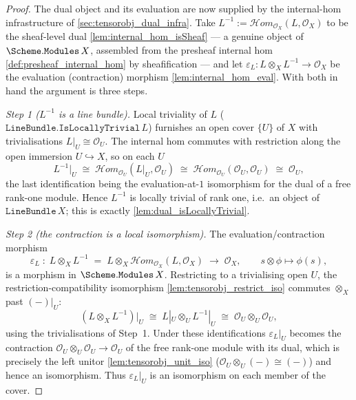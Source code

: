 \begin{proof}
  The dual object and its evaluation are now supplied by the internal-hom
  infrastructure of \cref{sec:tensorobj_dual_infra}. Take
  \(L^{-1} := \mathcal{H}om_{\mathcal{O}_X}(L, \mathcal{O}_X)\) to be the
  sheaf-level dual \cref{lem:internal_hom_isSheaf} --- a genuine object of
  \(\Scheme.\mathtt{Modules}\,X\), assembled from the presheaf internal hom
  \cref{def:presheaf_internal_hom} by sheafification --- and let
  \(\varepsilon_L : L \otimes_X L^{-1} \to \mathcal{O}_X\) be the evaluation
  (contraction) morphism \cref{lem:internal_hom_eval}. With both in hand the
  argument is three steps.

  \emph{Step 1 (\(L^{-1}\) is a line bundle).} Local triviality of \(L\)
  (\(\mathtt{LineBundle.IsLocallyTrivial}\,L\)) furnishes an open cover \(\{U\}\) of
  \(X\) with trivialisations \(L|_U \cong \mathcal{O}_U\). The internal hom commutes
  with restriction along the open immersion \(U \hookrightarrow X\), so on each \(U\)
  \[
    L^{-1}\big|_U \;\cong\; \mathcal{H}om_{\mathcal{O}_U}(L|_U, \mathcal{O}_U)
                 \;\cong\; \mathcal{H}om_{\mathcal{O}_U}(\mathcal{O}_U, \mathcal{O}_U)
                 \;\cong\; \mathcal{O}_U ,
  \]
  the last identification being the evaluation-at-\(1\) isomorphism for the dual of a
  free rank-one module. Hence \(L^{-1}\) is locally trivial of rank one, i.e.\ an
  object of \(\texttt{LineBundle}\,X\); this is exactly
  \cref{lem:dual_isLocallyTrivial}.

  \emph{Step 2 (the contraction is a local isomorphism).} The evaluation/contraction
  morphism
  \[
    \varepsilon_L \;\colon\; L \otimes_X L^{-1}
      \;=\; L \otimes_X \mathcal{H}om_{\mathcal{O}_X}(L, \mathcal{O}_X)
      \;\longrightarrow\; \mathcal{O}_X,
    \qquad s \otimes \phi \longmapsto \phi(s),
  \]
  is a morphism in \(\Scheme.\mathtt{Modules}\,X\). Restricting to a trivialising
  open \(U\), the restriction-compatibility isomorphism \cref{lem:tensorobj_restrict_iso}
  commutes \(\otimes_X\) past \((-)|_U\):
  \[
    (L \otimes_X L^{-1})\big|_U \;\cong\; L|_U \otimes_U L^{-1}|_U
      \;\cong\; \mathcal{O}_U \otimes_U \mathcal{O}_U ,
  \]
  using the trivialisations of Step~1. Under these identifications \(\varepsilon_L|_U\)
  becomes the contraction \(\mathcal{O}_U \otimes_U \mathcal{O}_U \to \mathcal{O}_U\) of
  the free rank-one module with its dual, which is precisely the left unitor
  \cref{lem:tensorobj_unit_iso} (\(\mathcal{O}_U \otimes_U (-) \cong (-)\)) and hence an
  isomorphism. Thus \(\varepsilon_L|_U\) is an isomorphism on each member of the cover.


\end{proof}
